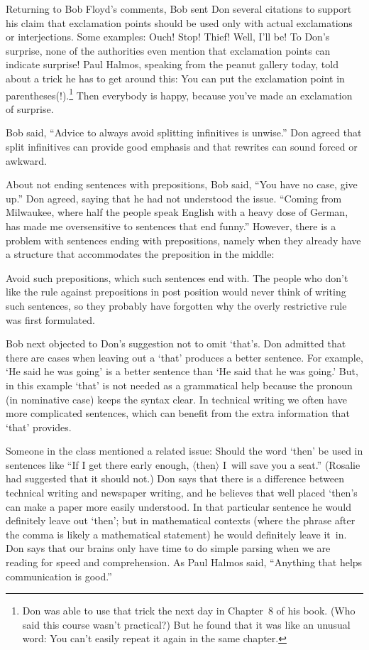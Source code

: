 Returning to Bob Floyd's comments, Bob sent Don several citations to
support his claim that exclamation points
 should be used only with actual exclamations or interjections.
Some examples: Ouch! Stop! Thief! Well, I'll be!
To Don's surprise, none of the authorities even mention that exclamation
points can indicate surprise! Paul Halmos, speaking from the peanut
gallery today, told about a trick he has to get around this: You can
put the exclamation point in parentheses(!).\footnote*{Don was able
to use that trick the next day in Chapter~8 of his book. (Who said
this course wasn't practical?) But he found that it was like an
unusual word: You can't easily repeat it again in the same chapter.}
Then everybody is happy, because you've made an exclamation of surprise.

Bob said, ``Advice to always avoid splitting infinitives is unwise.''  Don
agreed that split infinitives can provide good emphasis and that rewrites
can sound forced or awkward.

About not ending sentences with prepositions, Bob said, ``You have no case,
give up.''  Don agreed, saying that he had not understood the issue.
``Coming from Milwaukee, where half the people speak English with a
heavy dose of German, has made me oversensitive to sentences that end
funny.'' However, there is a problem with sentences ending with
prep\-ositions, namely when they already have a structure that accommodates
the preposition in the middle:

{\narrower\smallskip\noindent
Avoid such prepositions, which such sentences end with. The people who
don't like the rule against prepositions in post position would never
think of writing such sentences, so they probably have forgotten
why the overly restrictive rule was first formulated.
\smallskip}


Bob next objected to Don's suggestion not to omit `that's.  Don admitted
that there are cases when leaving out a `that' produces a better sentence.
For example, `He said he was going' is a better sentence than `He said
that he was going.'  But, in this example `that' is not needed as a
grammatical help because the pronoun (in nominative case) keeps the syntax
clear. 
In technical writing
we often have more complicated sentences, which can benefit from the extra
information that `that' provides.

Someone in the class mentioned a related issue: Should the word `then' be
used in sentences like ``If I get there early enough, $\langle$then$\rangle$ 
I~will save
you a seat.''  (Rosalie had suggested that it should not.)  Don says that
there is a difference between technical writing and newspaper writing, and
he believes that well placed `then's can make a paper more easily
understood.  In that particular sentence he would definitely leave
out `then'; but in mathematical contexts (where the phrase after the
comma is likely a mathematical statement) he would definitely leave it~in.
Don says that our brains only have time to do simple parsing when we are reading
for speed and comprehension.  As Paul Halmos said, ``Anything that helps 
communication is good.''

